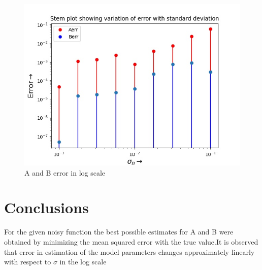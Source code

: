 \documentclass[11pt, a4paper]{article}
\begin{document}
\begin{figure}
   	\centering
 
   	\includegraphics[scale=0.6]{plots/Ques11.jpg}  %
   	\caption{A and B error in log scale}
   	\label{fig:A and B err in log scale}
\end{figure}
  
\section{Conclusions}
For the given noisy function the best possible estimates for A and B were
obtained by minimizing the mean squared error with the true value.It is
observed that error in estimation of the model parameters changes approximately linearly with respect to $\sigma$ in the log scale

 
\end{document}
